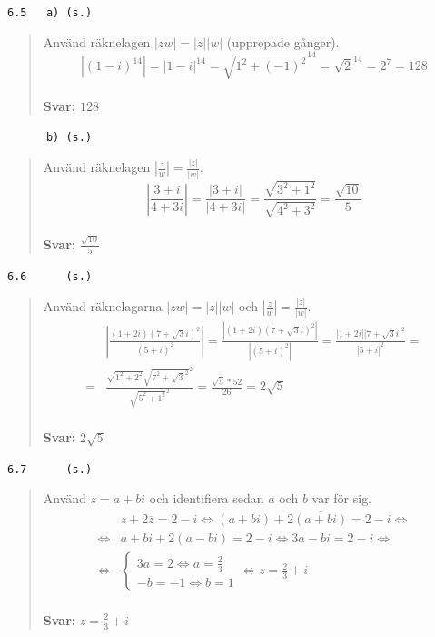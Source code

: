 \documentclass[a4paper]{article}
\newcommand{\tskcol}[1]{\textcolor{tskcol}{#1}}
\begin{document}
	\texttt{\tskcol{6.5~~~a) (s.)}}
	\begin{quotation}
		\noindent
		Använd räknelagen $|zw|=|z||w|$ (upprepade gånger).
		\[|(1-i)^{14}|=
		|1-i|^{14}=
		\sqrt{1^2+(-1)^2}^{14}=
		\sqrt{2}^{14}=
		2^7=
		128\]
		\\
		\textbf{Svar:} $128$
	\end{quotation}
	
	\pagebreak
	\texttt{\tskcol{~~~~~~b) (s.)}}
	\begin{quotation}
		\noindent
		Använd räknelagen $|\frac{z}{w}|=\frac{|z|}{|w|}$.
		\[\left|\frac{3+i}{4+3i}\right|=
		\frac{|3+i|}{|4+3i|}=
		\frac{\sqrt{3^2+1^2}}{\sqrt{4^2+3^2}}=
		\frac{\sqrt{10}}{5}\]
		\\
		\textbf{Svar:} $\frac{\sqrt{10}}{5}$
	\end{quotation}
	
	\texttt{\tskcol{6.6~~~~~ (s.)}}
	\begin{quotation}
		\noindent
		Använd räknelagarna $|zw|=|z||w|$ och $|\frac{z}{w}|=\frac{|z|}{|w|}$.
		\begin{align*}
		&\left|\frac{(1+2i)(7+\sqrt{3}i)^2}{(5+i)^2}\right|=
		\frac{|(1+2i)(7+\sqrt{3}i)^2|}{|(5+i)^2|}=
		\frac{|1+2i||7+\sqrt{3}i|^2}{|5+i|^2}= \\ =
		&\frac{\sqrt{1^2+2^2}\sqrt{7^2+\sqrt{3}^2}^2}{\sqrt{5^2+1^2}^2}=
		\frac{\sqrt{5}*52}{26}=
		2\sqrt{5}
		\end{align*}
		\\
		\textbf{Svar:} $2\sqrt{5}$
	\end{quotation}
	
	\texttt{\tskcol{6.7~~~~~ (s.)}}
	\begin{quotation}
		\noindent
		Använd $z=a+bi$ och identifiera sedan $a$ och $b$ var för sig.
		\begin{align*}
		&z+2\overline{z}=2-i \Leftrightarrow
		(a+bi)+2\overline{(a+bi)}=2-i \Leftrightarrow \\ \Leftrightarrow
		&a+bi+2(a-bi)=2-i \Leftrightarrow
		3a-bi=2-i \Leftrightarrow \\ \Leftrightarrow
		&\begin{cases}
		3a=2 \Leftrightarrow a =\frac{2}{3}\\
		-b=-1 \Leftrightarrow b=1
		\end{cases} \Leftrightarrow
		z=\frac{2}{3}+i
		\end{align*}
		\\
		\textbf{Svar:} $z=\frac{2}{3}+i$
	\end{quotation}
	
\end{document}
